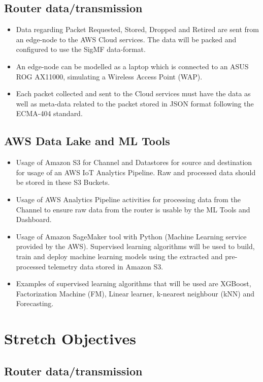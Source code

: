 \subsection{Router data/transmission}

\begin{itemize}
  \item Data regarding Packet Requested, Stored, Dropped and Retired are sent from an edge-node to the AWS Cloud services. The data will be packed and configured to use the SigMF data-format.
  \item An edge-node can be modelled as a laptop which is connected to an ASUS ROG AX11000, simulating a Wireless Access Point (WAP).
  \item Each packet collected and sent to the Cloud services must have the data as well as meta-data related to the packet stored in JSON format following the ECMA-404 standard.
\end{itemize}

\subsection{AWS Data Lake and ML Tools}

\begin{itemize}
  \item Usage of Amazon S3 for Channel and Datastores for source and destination for usage of an AWS IoT
Analytics Pipeline. Raw and processed data should be stored in these S3 Buckets.
  \item Usage of AWS Analytics Pipeline activities for processing data from the Channel to ensure raw data from the router is usable by the ML Tools and Dashboard.
  \item Usage of Amazon SageMaker tool with Python (Machine Learning service provided by the AWS).
Supervised learning algorithms will be used to build, train and deploy machine learning models using the extracted and pre-processed telemetry data stored in Amazon S3.
  \item Examples of supervised learning algorithms that will be used are XGBoost, Factorization Machine (FM), Linear learner, k-nearest neighbour (kNN) and Forecasting.
\end{itemize}

\section{Stretch Objectives}

\subsection{Router data/transmission}

